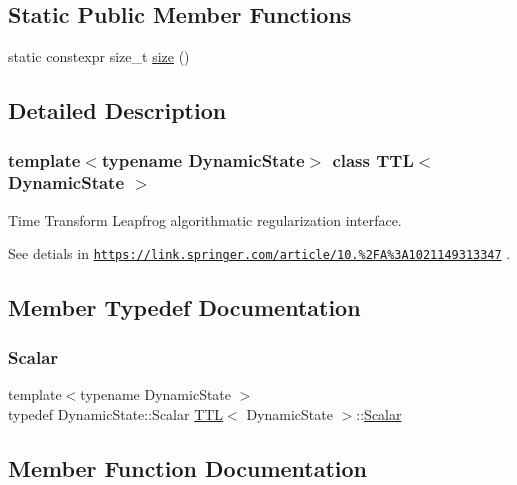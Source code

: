 \subsection*{Static Public Member Functions}
\begin{DoxyCompactItemize}
\item 
static constexpr size\+\_\+t \mbox{\hyperlink{class_t_t_l_afec8947e7c6c18561be42e3dea30a04d}{size}} ()
\end{DoxyCompactItemize}


\subsection{Detailed Description}
\subsubsection*{template$<$typename Dynamic\+State$>$\newline
class T\+T\+L$<$ Dynamic\+State $>$}

Time Transform Leapfrog algorithmatic regularization interface. 

See detials in \href{https://link.springer.com/article/10.1023%2FA%3A1021149313347}{\tt https\+://link.\+springer.\+com/article/10.\+1023\%2\+F\+A\%3\+A1021149313347} . 

\subsection{Member Typedef Documentation}
\mbox{\label{class_t_t_l_a7eb23a1fca47fc7b81e69cbd948059e9}} 
\subsubsection{\texorpdfstring{Scalar}{Scalar}}
{\footnotesize\ttfamily template$<$typename Dynamic\+State $>$ \\
typedef Dynamic\+State\+::\+Scalar \mbox{\hyperlink{class_t_t_l}{T\+TL}}$<$ Dynamic\+State $>$\+::\mbox{\hyperlink{class_t_t_l_a7eb23a1fca47fc7b81e69cbd948059e9}{Scalar}}}



\subsection{Member Function Documentation}
\mbox{\label{class_t_t_l_aedc11109f6e3cfd30203abb74cd906a2}} 
